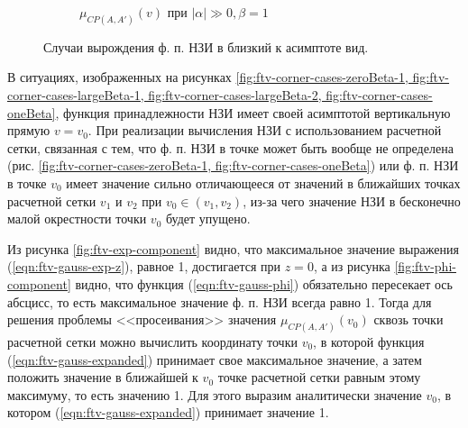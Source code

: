 \begin{figure}[htbp]
	\begin{subfigure}[t]{0.48\textwidth}
		\newcommand{\aOne}{1}
		\newcommand{\bOne}{0.1}
		\newcommand{\aTwo}{0.3}
		\newcommand{\bTwo}{0.1}
		\centering
		\caption{$\mu_{CP(A, A')}(v)$ при $|\alpha| \gg 0, \beta = 1$}
		\label{fig:ftv-corner-cases-oneBeta}
	\end{subfigure}
	
	\caption{Случаи вырождения ф. п. НЗИ в близкий к асимптоте вид.}
	\label{fig:ftv-gauss-corner-cases}
\end{figure}

В ситуациях, изображенных на рисунках \cref{fig:ftv-corner-cases-zeroBeta-1, fig:ftv-corner-cases-largeBeta-1, fig:ftv-corner-cases-largeBeta-2, fig:ftv-corner-cases-oneBeta}, функция принадлежности НЗИ имеет своей асимптотой вертикальную прямую $v = v_0$. При реализации вычисления НЗИ с использованием расчетной сетки, связанная с тем, что ф. п. НЗИ в точке может быть вообще не определена (рис. \cref{fig:ftv-corner-cases-zeroBeta-1, fig:ftv-corner-cases-oneBeta}) или ф. п. НЗИ в точке $v_0$ имеет значение сильно отличающееся от значений в ближайших точках расчетной сетки $v_1$ и $v_2$ при $v_0 \in (v_1, v_2)$, из-за чего значение НЗИ в бесконечно малой окрестности точки $v_0$ будет упущено.

Из рисунка \cref{fig:ftv-exp-component} видно, что максимальное значение выражения (\ref{eqn:ftv-gauss-exp-z}), равное 1, достигается при $z = 0$, а из рисунка \cref{fig:ftv-phi-component} видно, что функция (\ref{eqn:ftv-gauss-phi}) обязательно пересекает ось абсцисс, то есть максимальное значение ф. п. НЗИ всегда равно 1. Тогда для решения проблемы <<просеивания>> значения $\mu_{CP(A, A')}(v_0)$ сквозь точки расчетной сетки можно вычислить координату точки $v_0$, в которой функция (\ref{eqn:ftv-gauss-expanded}) принимает свое максимальное значение, а затем положить значение в ближайшей к $v_0$ точке расчетной сетки равным этому максимуму, то есть значению 1. Для этого выразим аналитически значение $v_0$, в котором (\ref{eqn:ftv-gauss-expanded}) принимает значение 1.

